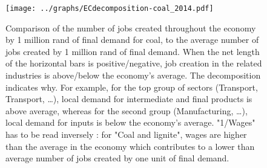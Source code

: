 \documentclass[12pt,english]{article}
\begin{document}
%
%





\begin{figure}[!h]
	\centering
	\hspace{-16pt}\texttt{[image: ../graphs/ECdecomposition-coal\_2014.pdf]}
	\caption{\label{ECdecomposition-coal_2014}\small Comparison of the number of jobs created throughout the economy by 1 million rand of final demand for coal, to the average number of jobs created by 1 million rand of final demand. When the net length of the horizontal bars is positive/negative, job creation in the related industries is above/below the economy's average. The decomposition indicates why. For example, for the top group of sectors (Transport, Transport, \ldots), local demand for intermediate and final products is above average, whereas for the second group (Manufacturing, \ldots), local demand for inputs is below the economy's average. "1/Wages" has to be read inversely : for "Coal and lignite", wages are higher than the average in the economy which contributes to a lower than average number of jobs created by one unit of final demand. }
\end{figure}
\end{document}
